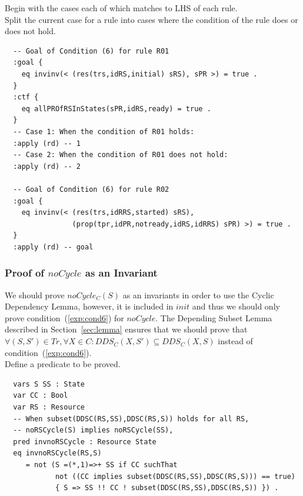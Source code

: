 \documentclass[12pt]{report}
\begin{document}
\vspace{0.3cm}
 Begin with the cases each of which matches to
LHS of each rule. \\ 
 Split the current case for a rule into
cases where the condition of the rule does or does not hold. 
\small
\begin{verbatim}
  -- Goal of Condition (6) for rule R01
  :goal {
    eq invinv(< (res(trs,idRS,initial) sRS), sPR >) = true .
  }
  :ctf {
    eq allPROfRSInStates(sPR,idRS,ready) = true .
  }
  -- Case 1: When the condition of R01 holds:
  :apply (rd) -- 1
  -- Case 2: When the condition of R01 does not hold:
  :apply (rd) -- 2

  -- Goal of Condition (6) for rule R02
  :goal {
    eq invinv(< (res(trs,idRRS,started) sRS),
                (prop(tpr,idPR,notready,idRS,idRRS) sPR) >) = true .
  }
  :apply (rd) -- goal
\end{verbatim}
\normalsize

\subsubsection*{Proof of $noCycle$ as an Invariant}
We should prove $noCycle_C(S)$ as an invariants in order to use the
Cyclic Dependency Lemma, however, it is included in $init$ and thus we
should only prove condition~(\ref{exp:cond6}) for $noCycle$.  The
Depending Subset Lemma described in Section~\ref{sec:lemma} ensures
that we should prove that $\forall (S,S') \in Tr, \forall X\in
C:DDS_C(X,S')\subseteq DDS_C(X,S)$ instead of
condition~(\ref{exp:cond6}).\\

 Define a predicate to be proved. 
\small
\begin{verbatim}
  vars S SS : State
  var CC : Bool
  var RS : Resource
  -- When subset(DDSC(RS,SS),DDSC(RS,S)) holds for all RS,
  -- noRSCycle(S) implies noRSCycle(SS),
  pred invnoRSCycle : Resource State
  eq invnoRSCycle(RS,S) 
     = not (S =(*,1)=>+ SS if CC suchThat
            not ((CC implies subset(DDSC(RS,SS),DDSC(RS,S))) == true)
            { S => SS !! CC ! subset(DDSC(RS,SS),DDSC(RS,S)) }) .
\end{verbatim}
\normalsize
\end{document}
